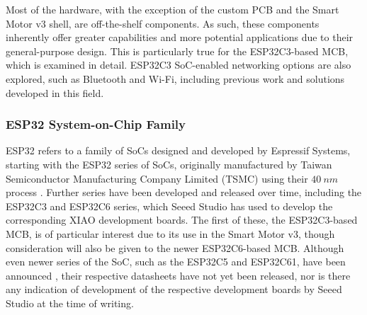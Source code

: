 Most of the hardware, with the exception of the custom PCB and the Smart Motor v3 shell, are off-the-shelf components. As such, these components inherently offer greater capabilities and more potential applications due to their general-purpose design. This is particularly true for the ESP32C3-based MCB, which is examined in detail. ESP32C3 SoC-enabled networking options are also explored, such as Bluetooth and Wi-Fi, including previous work and solutions developed in this field.

\subsubsection{\label{sec:rev_esp}ESP32 System-on-Chip Family}

ESP32 refers to a family of SoCs designed and developed by Espressif Systems, starting with the ESP32 series of SoCs, originally manufactured by Taiwan Semiconductor Manufacturing Company Limited (TSMC) using their $40\ nm$ process \citep{espressif_systems_esp32_2025}.
Further series have been developed and released over time, including the ESP32C3 and ESP32C6 series, which Seeed Studio has used to develop the corresponding XIAO development boards. The first of these, the ESP32C3-based MCB, is of particular interest due to its use in the Smart Motor v3, though consideration will also be given to the newer ESP32C6-based MCB. Although even newer series of the SoC, such as the ESP32C5 and ESP32C61, have been announced \citep{espressif_systems_esp_nodate}, their respective datasheets have not yet been released, nor is there any indication of development of the respective development boards by Seeed Studio at the time of writing.\\


